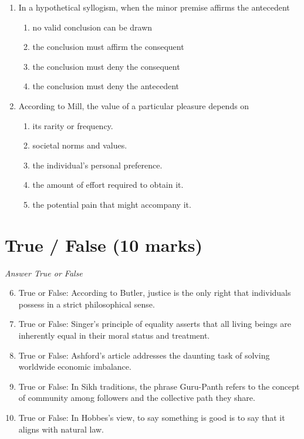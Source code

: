 \documentclass[12pt]{article}
\begin{document}
\begin{enumerate}[label=\arabic*.]
\begin{enumerate}[label=(\alph*)]
\end{enumerate}
\item In a hypothetical syllogism, when the minor premise affirms the antecedent
\begin{enumerate}[label=(\alph*)]
    \item no valid conclusion can be drawn
    \item the conclusion must affirm the consequent
    \item the conclusion must deny the consequent
    \item the conclusion must deny the antecedent
\end{enumerate}
\item According to Mill, the value of a particular pleasure depends on
\begin{enumerate}[label=(\alph*)]
    \item its rarity or frequency.
    \item societal norms and values.
    \item the individual's personal preference.
    \item the amount of effort required to obtain it.
    \item the potential pain that might accompany it.
\end{enumerate}
\end{enumerate}

\section*{True / False (10 marks)}
\textit{Answer True or False}
\begin{enumerate}[label=\arabic*.]
\setcounter{enumi}{5}
\item True or False: According to Butler, justice is the only right that individuals possess in a strict philosophical sense.
\item True or False: Singer's principle of equality asserts that all living beings are inherently equal in their moral status and treatment.
\item True or False: Ashford's article addresses the daunting task of solving worldwide economic imbalance.
\item True or False: In Sikh traditions, the phrase Guru-Panth refers to the concept of community among followers and the collective path they share.
\item True or False: In Hobbes's view, to say something is good is to say that it aligns with natural law.
\end{enumerate}
\end{document}
